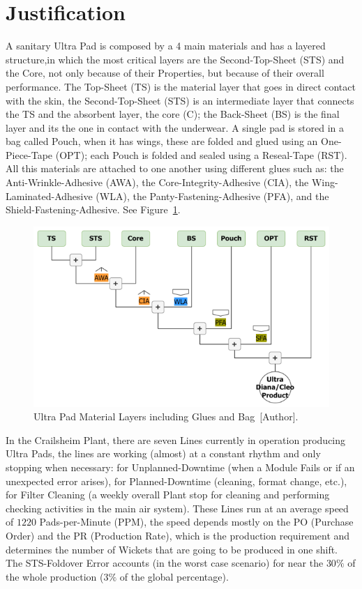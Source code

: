 \section{Justification}
%
A sanitary Ultra Pad is composed by a 4 main materials and has a layered structure,in which the most critical layers are the Second-Top-Sheet (STS) and the Core, not only because of their Properties, but because of their overall performance. The Top-Sheet (TS) is the material layer that goes in direct contact with the skin, the Second-Top-Sheet (STS) is an intermediate layer that connects the TS and the absorbent layer, the core (C); the Back-Sheet (BS) is the final layer and its the one in contact with the underwear. A single pad is stored in a bag called Pouch, when it has wings, these are folded and glued using an One-Piece-Tape (OPT); each Pouch is folded and sealed using a Reseal-Tape (RST).  All this materials are attached to one another using different glues such as: the Anti-Wrinkle-Adhesive (AWA), the Core-Integrity-Adhesive (CIA),  the Wing-Laminated-Adhesive (WLA), the Panty-Fastening-Adhesive (PFA), and the Shield-Fastening-Adhesive.  See Figure~\ref{Layer}. 
%
\begin{figure}[H]
    \centering
    \includegraphics[scale=0.5]{FIGURES/Layers.png}
    \caption{Ultra Pad Material Layers including Glues and Bag~[Author].}
    \label{Layer}
\end{figure}

In the Crailsheim Plant, there are seven Lines currently in operation producing Ultra Pads, the lines are working (almost) at a constant rhythm and only stopping when necessary: for Unplanned-Downtime (when a Module Fails or if an unexpected error arises), for Planned-Downtime (cleaning, format change, etc.), for Filter Cleaning (a weekly overall Plant stop for cleaning  and performing checking activities in the main air system). These Lines run at an average speed of $1220$ Pads-per-Minute (PPM), the speed depends mostly on the PO (Purchase Order) and the PR (Production Rate), which is the production requirement and determines the number of Wickets that are going to be produced in one shift. The STS-Foldover Error accounts (in the worst case scenario) for near the $30\%$ of the whole production ($3\%$ of the global percentage).


